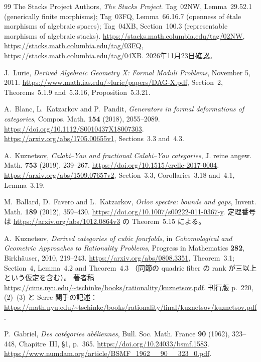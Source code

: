 \begin{thebibliography}{99}
The Stacks Project Authors, \emph{The Stacks Project}.
Tag~02NW, Lemma~29.52.1 (generically finite morphisms);
Tag~03FQ, Lemma~66.16.7 (openness of \'etale morphisms of algebraic spaces);
Tag~04XB, Section~100.3 (representable morphisms of algebraic stacks).
\url{https://stacks.math.columbia.edu/tag/02NW},
\url{https://stacks.math.columbia.edu/tag/03FQ},
\url{https://stacks.math.columbia.edu/tag/04XB}.
2026年11月23日確認。

J.~Lurie,
\emph{Derived Algebraic Geometry X: Formal Moduli Problems}, November 5, 2011.
\url{https://www.math.ias.edu/~lurie/papers/DAG-X.pdf},
Section~2, Theorems~5.1.9 and~5.3.16, Proposition~5.3.21.

A.~Blanc, L.~Katzarkov and P.~Pandit,
\emph{Generators in formal deformations of categories},
Compos. Math. \textbf{154} (2018), 2055--2089.
\url{https://doi.org/10.1112/S0010437X18007303}.
\url{https://arxiv.org/abs/1705.00655v1}, Sections~3.3 and~4.3.

A.~Kuznetsov,
\emph{Calabi--Yau and fractional Calabi--Yau categories},
J. reine angew. Math. \textbf{753} (2019), 239--267.
\url{https://doi.org/10.1515/crelle-2017-0004}.
\url{https://arxiv.org/abs/1509.07657v2},
Section~3.3, Corollaries~3.18 and~4.1, Lemma~3.19.

M.~Ballard, D.~Favero and L.~Katzarkov,
\emph{Orlov spectra: bounds and gaps},
Invent. Math. \textbf{189} (2012), 359--430.
\url{https://doi.org/10.1007/s00222-011-0367-y}.
定理番号は \url{https://arxiv.org/abs/1012.0864v3} の Theorem~5.15 による。

A.~Kuznetsov,
\emph{Derived categories of cubic fourfolds},
in \emph{Cohomological and Geometric Approaches to Rationality Problems},
Progress in Mathematics \textbf{282}, Birkh\"auser, 2010, 219--243.
\url{https://arxiv.org/abs/0808.3351}, Theorem~3.1;
Section~4, Lemma~4.2 and Theorem~4.3
（同節の quadric fiber の rank が三以上という仮定を含む）。
著者稿 \url{https://cims.nyu.edu/~tschinke/books/rationality/kuznetsov.pdf}.
刊行版 p.~220, (2)--(3) と Serre 関手の記述：
\url{https://math.nyu.edu/~tschinke/books/rationality/final/kuznetsov/kuznetsov.pdf}.

P.~Gabriel, \emph{Des cat\'egories ab\'eliennes},
Bull. Soc. Math. France \textbf{90} (1962), 323--448,
Chapitre~III, \S1, p.~365.
\url{https://doi.org/10.24033/bsmf.1583}.
\url{https://www.numdam.org/article/BSMF_1962__90__323_0.pdf}.


\end{thebibliography}
